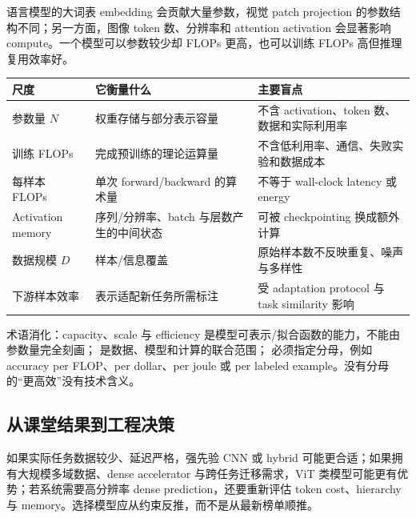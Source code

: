 \documentclass[a4paper]{article}
\begin{document}
语言模型的大词表 embedding 会贡献大量参数，视觉 patch projection 的参数结构不同；另一方面，图像 token 数、分辨率和 attention activation 会显著影响 compute。一个模型可以参数较少却 FLOPs 更高，也可以训练 FLOPs 高但推理复用效率好。

\begin{longtable}{L{0.19\textwidth}L{0.31\textwidth}L{0.40\textwidth}}
\toprule
尺度 & 它衡量什么 & 主要盲点 \\
\midrule
参数量 $N$ & 权重存储与部分表示容量 & 不含 activation、token 数、数据和实际利用率 \\
训练 FLOPs & 完成预训练的理论运算量 & 不含低利用率、通信、失败实验和数据成本 \\
每样本 FLOPs & 单次 forward/backward 的算术量 & 不等于 wall-clock latency 或 energy \\
Activation memory & 序列/分辨率、batch 与层数产生的中间状态 & 可被 checkpointing 换成额外计算 \\
数据规模 $D$ & 样本/信息覆盖 & 原始样本数不反映重复、噪声与多样性 \\
下游样本效率 & 表示适配新任务所需标注 & 受 adaptation protocol 与 task similarity 影响 \\
\bottomrule
\end{longtable}

\begin{knowledgebox}{术语消化：capacity、scale 与 efficiency}
 是模型可表示/拟合函数的能力，不能由参数量完全刻画； 是数据、模型和计算的联合范围； 必须指定分母，例如 accuracy per FLOP、per dollar、per joule 或 per labeled example。没有分母的“更高效”没有技术含义。
\end{knowledgebox}


\subsection{从课堂结果到工程决策}

如果实际任务数据较少、延迟严格，强先验 CNN 或 hybrid 可能更合适；如果拥有大规模多域数据、dense accelerator 与跨任务迁移需求，ViT 类模型可能更有优势；若系统需要高分辨率 dense prediction，还要重新评估 token cost、hierarchy 与 memory。选择模型应从约束反推，而不是从最新榜单顺推。
\end{document}
